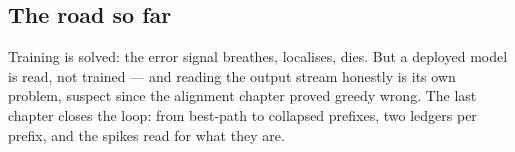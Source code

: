 \cleardoublepage
\begin{narrative}
\section*{The road so far}


\noindent Training is solved: the error signal breathes, localises, dies. But a deployed model is read, not trained — and reading the output stream honestly is its own problem, suspect since the alignment chapter proved greedy wrong. The last chapter closes the loop: from best-path to collapsed prefixes, two ledgers per prefix, and the spikes read for what they are.
\end{narrative}
